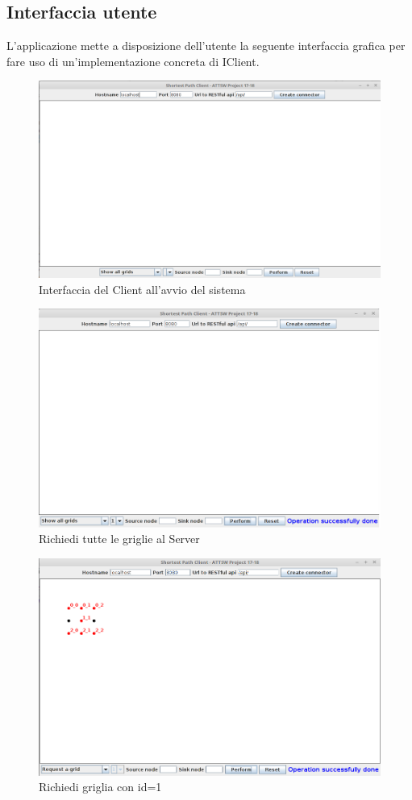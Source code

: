 \subsection{Interfaccia utente}
L'applicazione mette a disposizione dell'utente la seguente interfaccia grafica per fare uso di un'implementazione concreta di IClient.
\begin{figure}
	\centering
	\includegraphics[width=0.7\linewidth]{Chapters/1}
	\caption[Interfaccia utente]{Interfaccia del Client all'avvio del sistema}
	\label{fig:1}
\end{figure}

\begin{figure}
	\centering
	\includegraphics[width=0.7\linewidth]{Chapters/2}
	\caption[Interfaccia utente]{Richiedi tutte le griglie al Server}
	\label{fig:2}
\end{figure}

\begin{figure}
	\centering
	\includegraphics[width=0.7\linewidth]{Chapters/3}
	\caption[Interfaccia utente]{Richiedi griglia con id=1}
	\label{fig:3}
\end{figure}

